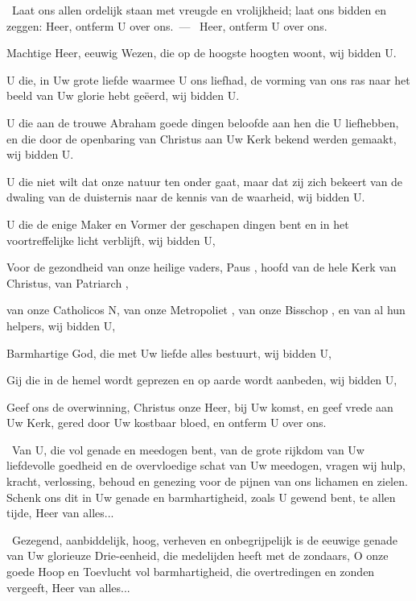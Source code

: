 \documentclass[12pt,twoside,a5paper]{article}
\begin{document}
\begin{halfparskip}
  \dd~Laat ons allen ordelijk staan met vreugde en vrolijkheid; laat ons bidden en zeggen: Heer, ontferm U over ons.~--- \rr~Heer, ontferm U over ons. 

  Machtige Heer, eeuwig Wezen, die op de hoogste hoogten woont, wij bidden U.

  U die, in Uw grote liefde waarmee U ons liefhad, de vorming van ons ras naar het beeld van Uw glorie hebt geëerd, wij bidden U.

  U die aan de trouwe Abraham goede dingen beloofde aan hen die U liefhebben, en die door de openbaring van Christus aan Uw Kerk bekend werden gemaakt, wij bidden U.

  U die niet wilt dat onze natuur ten onder gaat, maar dat zij zich bekeert van de dwaling van de duisternis naar de kennis van de waarheid, wij bidden U.

  U die de enige Maker en Vormer der geschapen dingen bent en in het voortreffelijke licht verblijft, wij bidden U,

  Voor de gezondheid van onze heilige vaders, Paus \NN , hoofd van de hele Kerk van Christus, van Patriarch \NN ,

  van onze Catholicos N, van onze Metropoliet \NN , van onze Bisschop \NN , en van al hun helpers, wij bidden U,

  Barmhartige God, die met Uw liefde alles bestuurt, wij bidden U,

  Gij die in de hemel wordt geprezen en op aarde wordt aanbeden, wij bidden U,

  Geef ons de overwinning, Christus onze Heer, bij Uw komst, en geef vrede aan Uw Kerk, gered door Uw kostbaar bloed, en ontferm U over ons.

  \cc~Van U, die vol genade en meedogen bent, van de grote rijkdom van Uw liefdevolle goedheid en de overvloedige schat van Uw meedogen, vragen wij hulp, kracht, verlossing, behoud en genezing voor de pijnen van ons lichamen en zielen. Schenk ons dit in Uw genade en barmhartigheid, zoals U gewend bent, te allen tijde, Heer van alles...

  \cc~Gezegend, aanbiddelijk, hoog, verheven en onbegrijpelijk is de eeuwige genade van Uw glorieuze Drie-eenheid, die medelijden heeft met de zondaars, O onze goede Hoop en Toevlucht vol barmhartigheid, die overtredingen en zonden vergeeft, Heer van alles...
\end{halfparskip}
\end{document}
